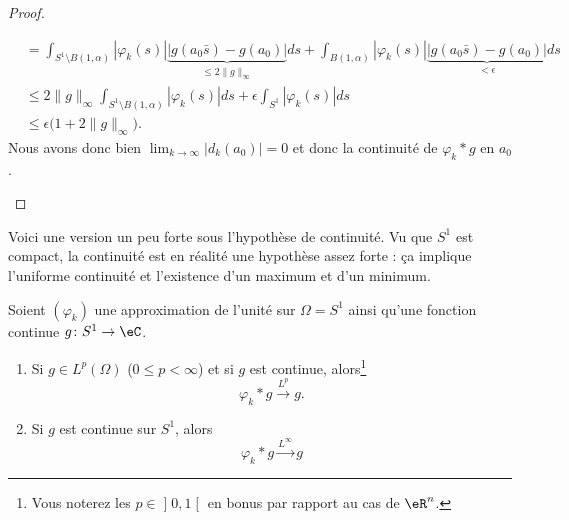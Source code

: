 \begin{proof}
\begin{subproof}
\begin{subequations}
\begin{align}
				             & =\int_{S^1\setminus B(1,\alpha)}| \varphi_k(s) |\underbrace{\big| g(a_0\bar s)-g(a_0) \big|}_{\leq 2\| g \|_{\infty}}ds+\int_{B(1,\alpha)}| \varphi_k(s) |\underbrace{\big| g(a_0\bar s)-g(a_0) \big|}_{<\epsilon}ds \\
				             & \leq 2\| g \|_{\infty}\int_{S^1\setminus B(1,\alpha)}| \varphi_k(s) |ds+\epsilon\int_{S^1}| \varphi_k(s) |ds                                                                                                         \\
				             & \leq \epsilon\big( 1+2\| g \|_{\infty} \big).
			\end{align}
		\end{subequations}
		Nous avons donc bien \( \lim_{k\to \infty} | d_k(a_0) |=0\) et donc la continuité de \( \varphi_k*g\) en \( a_0\).

	\end{subproof}
\end{proof}

Voici une version un peu forte sous l'hypothèse de continuité. Vu que \( S^1\) est compact, la continuité est en réalité une hypothèse assez forte : ça implique l'uniforme continuité et l'existence d'un maximum et d'un minimum.
\begin{proposition}
	Soient \( (\varphi_k)\) une approximation de l'unité sur \( \Omega=S^1\) ainsi qu'une fonction continue \( g\colon S^1\to \eC\).
	\begin{enumerate}
		\item       \label{ITEMooPHBJooOHDVoW}
		      Si \( g\in L^p(\Omega)\) (\( 0\leq p<\infty\)) et si \( g\) est continue, alors\footnote{Vous noterez les \( p\in \mathopen] 0 , 1 \mathclose[\) en bonus par rapport au cas de \( \eR^n\).}
		      \begin{equation}
			      \varphi_k*g\stackrel{L^p}{\to}g.
		      \end{equation}
		\item       \label{ITEMooLOSVooDtaugF}
		      Si \( g\) est continue sur \( S^1\), alors
		      \begin{equation}
			      \varphi_k*g\stackrel{L^{\infty}}{\to}g
		      \end{equation}
	\end{enumerate}
\end{proposition}

